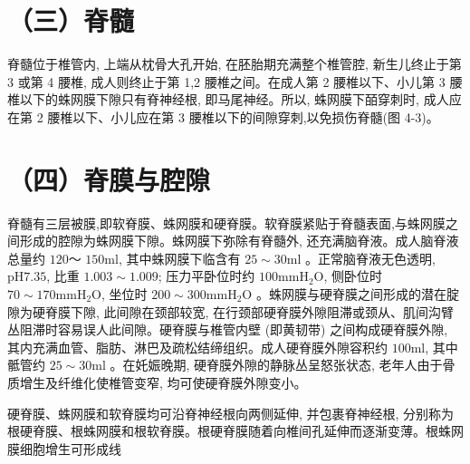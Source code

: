 \documentclass[10pt]{article}
\begin{document}
\section*{（三）脊髓}
脊髓位于椎管内, 上端从枕骨大孔开始, 在胚胎期充满整个椎管腔, 新生儿终止于第 3 或第 4 腰椎, 成人则终止于第 1,2 腰椎之间。在成人第 2 腰椎以下、小儿第 3 腰椎以下的蛛网膜下隙只有脊神经根, 即马尾神经。所以, 蛛网膜下皕穿刺时, 成人应在第 2 腰椎以下、小儿应在第 3 腰椎以下的间隙穿刺,以免损伤脊髓(图 4-3)。

\section*{（四）脊膜与腔隙}
脊髓有三层被膜,即软脊膜、蛛网膜和硬脊膜。软脊膜紧贴于脊髓表面,与蛛网膜之间形成的腔隙为蛛网膜下隙。蛛网膜下弥除有脊髓外, 还充满脑脊液。成人脑脊液总量约 $120 ～$ $150 \mathrm{ml}$, 其中蛛网膜下临含有 $25 \sim 30 \mathrm{ml}$ 。正常脑脊液无色透明, $\mathrm{pH} 7.35$, 比重 $1.003 \sim 1.009$; 压力平卧位时约 $100 \mathrm{mmH}_{2} \mathrm{O}$, 侧卧位时 $70 \sim 170 \mathrm{mmH}_{2} \mathrm{O}$, 坐位时 $200 \sim 300 \mathrm{mmH}_{2} \mathrm{O}$ 。蛛网膜与硬脊膜之间形成的潜在腚隙为硬脊膜下隙, 此间隙在颈部较宽, 在行颈部硬脊膜外隙阻滞或颈从、肌间沟臂丛阻滞时容易误人此间隙。硬脊膜与椎管内壁 (即黄韧带) 之间构成硬脊膜外隙, 其内充满血管、脂肪、淋巴及疏松结缔组织。成人硬脊膜外隙容积约 $100 \mathrm{ml}$, 其中骶管约 $25 \sim 30 \mathrm{ml}$ 。在奼娠晚期, 硬脊膜外隙的静脉丛呈怒张状态, 老年人由于骨质增生及纤维化使椎管变窄, 均可使硬脊膜外隙变小。

硬脊膜、蛛网膜和软脊膜均可沿脊神经根向两侧延伸, 并包裹脊神经根, 分别称为根硬脊膜、根蛛网膜和根软脊膜。根硬脊膜随着向椎间孔延伸而逐渐变薄。根蛛网膜细胞增生可形成线
\end{document}
